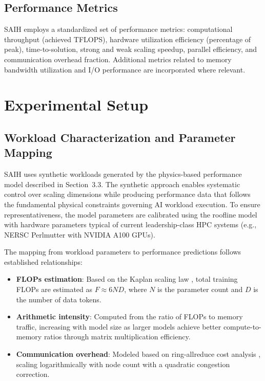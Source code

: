 \documentclass{llncs}
\begin{document}
\subsection{Performance Metrics}

SAIH employs a standardized set of performance metrics: computational throughput (achieved TFLOPS), hardware utilization efficiency (percentage of peak), time-to-solution, strong and weak scaling speedup, parallel efficiency, and communication overhead fraction. Additional metrics related to memory bandwidth utilization and I/O performance are incorporated where relevant.

\section{Experimental Setup}

\subsection{Workload Characterization and Parameter Mapping}

SAIH uses synthetic workloads generated by the physics-based performance model described in Section~3.3. The synthetic approach enables systematic control over scaling dimensions while producing performance data that follows the fundamental physical constraints governing AI workload execution. To ensure representativeness, the model parameters are calibrated using the roofline model \cite{Williams2009Roofline} with hardware parameters typical of current leadership-class HPC systems (e.g., NERSC Perlmutter with NVIDIA A100 GPUs).

The mapping from workload parameters to performance predictions follows established relationships:

\begin{itemize}
    \item \textbf{FLOPs estimation}: Based on the Kaplan scaling law \cite{Kaplan2020ScalingLaws}, total training FLOPs are estimated as $F \approx 6 N D$, where $N$ is the parameter count and $D$ is the number of data tokens.
    \item \textbf{Arithmetic intensity}: Computed from the ratio of FLOPs to memory traffic, increasing with model size as larger models achieve better compute-to-memory ratios through matrix multiplication efficiency.
    \item \textbf{Communication overhead}: Modeled based on ring-allreduce cost analysis \cite{Thakur2005Allreduce}, scaling logarithmically with node count with a quadratic congestion correction.
\end{itemize}
\end{document}
